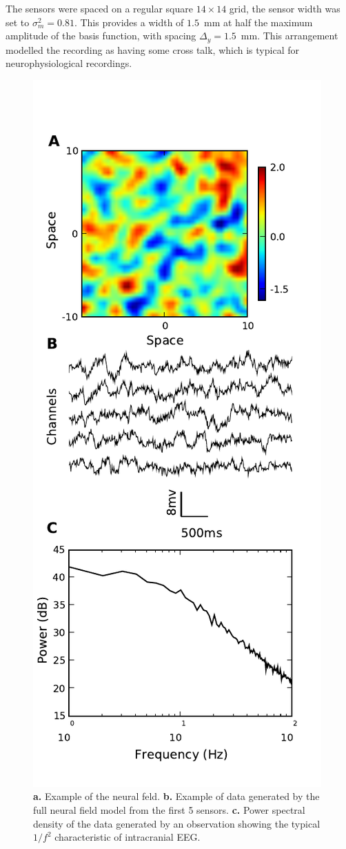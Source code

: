 \documentclass[10pt]{article}
\begin{document}
The sensors were spaced on a regular square $14 \times 14$ grid, the sensor width was set to $\sigma^2_m = 0.81$. This provides a width of $1.5$~mm at half the maximum amplitude of the basis function, with spacing $\Delta_y = 1.5$~mm. This arrangement modelled the recording as having some cross talk, which is typical for neurophysiological recordings.
 \begin{figure}
    	\begin{center}
     		\includegraphics[scale=1]{./Graph/ExperimentalFigure.pdf}
    	\end{center}
    	\caption{\textbf{a.} Example of the neural feld. \textbf{b.} Example of data generated by the full neural field model from the first 5 sensors. \textbf{c.} Power spectral density of the data generated by an observation showing the typical $1/f^2$ characteristic of intracranial EEG.} 
 \label{fig:experimental design}
 \end{figure}
\end{document}

